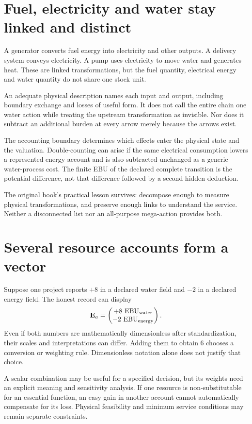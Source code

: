 \section{Fuel, electricity and water stay linked and distinct}
A generator converts fuel energy into electricity and other outputs. A delivery system conveys electricity. A pump uses electricity to move water and generates heat. These are linked transformations, but the fuel quantity, electrical energy and water quantity do not share one stock unit.

An adequate physical description names each input and output, including boundary exchange and losses of useful form. It does not call the entire chain one water action while treating the upstream transformation as invisible. Nor does it subtract an additional burden at every arrow merely because the arrows exist.

The accounting boundary determines which effects enter the physical state and the valuation. Double-counting can arise if the same electrical consumption lowers a represented energy account and is also subtracted unchanged as a generic water-process cost. The finite EBU of the declared complete transition is the potential difference, not that difference followed by a second hidden deduction.

The original book's practical lesson survives: decompose enough to measure physical transformations, and preserve enough links to understand the service. Neither a disconnected list nor an all-purpose mega-action provides both.

\section{Several resource accounts form a vector}
Suppose one project reports $+8$ in a declared water field and $-2$ in a declared energy field. The honest record can display
\begin{equation}
 \mathbf E_a=\begin{pmatrix}+8\ \E_{\mathrm{water}}\\-2\ \E_{\mathrm{energy}}\end{pmatrix}.
\end{equation}
Even if both numbers are mathematically dimensionless after standardization, their scales and interpretations can differ. Adding them to obtain 6 chooses a conversion or weighting rule. Dimensionless notation alone does not justify that choice.

A scalar combination may be useful for a specified decision, but its weights need an explicit meaning and sensitivity analysis. If one resource is non-substitutable for an essential function, an easy gain in another account cannot automatically compensate for its loss. Physical feasibility and minimum service conditions may remain separate constraints.


